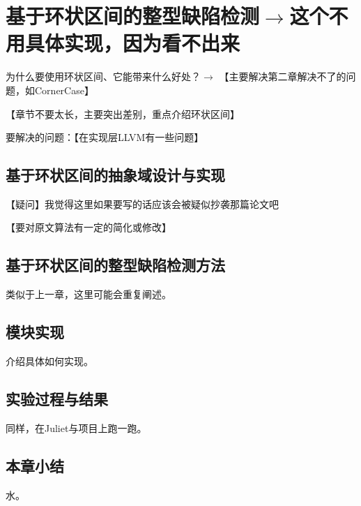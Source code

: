 
\chapter{基于环状区间的整型缺陷检测$\rightarrow$这个不用具体实现，因为看不出来}

为什么要使用环状区间、它能带来什么好处？$\rightarrow$ 【主要解决第二章解决不了的问题，如CornerCase】

【章节不要太长，主要突出差别，重点介绍环状区间】

要解决的问题：【在实现层LLVM有一些问题】

\section{基于环状区间的抽象域设计与实现}

【疑问】我觉得这里如果要写的话应该会被疑似抄袭那篇论文吧

【要对原文算法有一定的简化或修改】

\section{基于环状区间的整型缺陷检测方法}

类似于上一章，这里可能会重复阐述。

\section{模块实现}

介绍具体如何实现。

\section{实验过程与结果}

同样，在Juliet与项目上跑一跑。

\section{本章小结}

水。